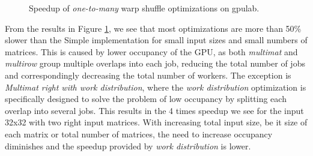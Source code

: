 \begin{figure}[ht]
	\centering	
	\begin{subfigure}{0.49\textwidth}
		\centering
		\def\svgwidth{\textwidth}
		
	\end{subfigure}
	\hfill
	\begin{subfigure}{0.49\textwidth}
		\centering
		\def\svgwidth{\textwidth}
		
	\end{subfigure}
	\hfill
	\begin{subfigure}{0.49\textwidth}
		\centering
		\def\svgwidth{\textwidth}
		
	\end{subfigure}
	\hfill
	\begin{subfigure}{0.49\textwidth}
		\centering
		\def\svgwidth{\textwidth}
		
	\end{subfigure}
	
	\caption{Speedup of \textit{one-to-many} warp shuffle optimizations on gpulab.}
	\label{fig:warp_shuffle_one_to_many_results}
\end{figure}

From the results in Figure \ref{fig:warp_shuffle_one_to_many_results}, we see that most optimizations are more than 50\% slower than the Simple implementation for small input sizes and small numbers of matrices. This is caused by lower occupancy of the GPU, as both \textit{multimat} and \textit{multirow} group multiple overlaps into each job, reducing the total number of jobs and correspondingly decreasing the total number of workers. The exception is \textit{Multimat right with work distribution}, where the \textit{work distribution} optimization is specifically designed to solve the problem of low occupancy by splitting each overlap into several jobs. This results in the 4 times speedup we see for the input 32x32 with two right input matrices. With increasing total input size, be it size of each matrix or total number of matrices, the need to increase occupancy diminishes and the speedup provided by \textit{work distribution} is lower.

